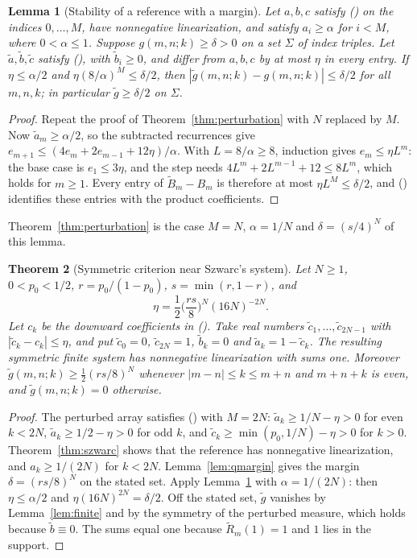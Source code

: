 \documentclass[twoside,10pt]{article}
\numberwithin{equation}{section}
\theoremstyle{slbody}
\newtheorem{theorem}{Theorem}[section]
\newtheorem{lemma}[theorem]{Lemma}
\theoremstyle{definition}
\theoremstyle{remark}
\renewcommand{\eqref}[1]{\textup{{\normalfont(\oldstylenums{\ref{#1}}}\normalfont)}}
\begin{document}
\begin{lemma}[Stability of a reference with a margin]\label{lem:stability}
Let $a,b,c$ satisfy \eqref{eq:basic} on the indices $0,\ldots,M$, have nonnegative linearization, and satisfy $a_i\geq\alpha$ for $i<M$, where $0<\alpha\leq1$. Suppose $g(m,n;k)\geq\delta>0$ on a set $\Sigma$ of index triples. Let $\widetilde a,\widetilde b,\widetilde c$ satisfy \eqref{eq:basic}, with $\widetilde b_i\geq0$, and differ from $a,b,c$ by at most $\eta$ in every entry. If $\eta\leq\alpha/2$ and $\eta(8/\alpha)^M\leq\delta/2$, then $|\widetilde g(m,n;k)-g(m,n;k)|\leq\delta/2$ for all $m,n,k$; in particular $\widetilde g\geq\delta/2$ on $\Sigma$.
\end{lemma}
\begin{proof}
Repeat the proof of Theorem~\ref{thm:perturbation} with $N$ replaced by $M$. Now $\widetilde a_m\geq\alpha/2$, so the subtracted recurrences give $e_{m+1}\leq(4e_m+2e_{m-1}+12\eta)/\alpha$. With $L=8/\alpha\geq8$, induction gives $e_m\leq\eta L^m$: the base case is $e_1\leq3\eta$, and the step needs $4L^m+2L^{m-1}+12\leq8L^m$, which holds for $m\geq1$. Every entry of $\widetilde B_m-B_m$ is therefore at most $\eta L^M\leq\delta/2$, and \eqref{eq:matrix-product} identifies these entries with the product coefficients.
\end{proof}

Theorem~\ref{thm:perturbation} is the case $M=N$, $\alpha=1/N$ and $\delta=(s/4)^N$ of this lemma.

\begin{theorem}[Symmetric criterion near Szwarc's system]\label{thm:symmetric}
Let $N\geq1$, $0<p_0<1/2$, $r=p_0/(1-p_0)$, $s=\min(r,1-r)$, and
\[
\eta=\frac12\Big(\frac{rs}8\Big)^N(16N)^{-2N}.
\]
Let $c_k$ be the downward coefficients in \eqref{eq:qarray}. Take real numbers $\widetilde c_1,\ldots,\widetilde c_{2N-1}$ with $|\widetilde c_k-c_k|\leq\eta$, and put $\widetilde c_0=0$, $\widetilde c_{2N}=1$, $\widetilde b_k=0$ and $\widetilde a_k=1-\widetilde c_k$. The resulting symmetric finite system has nonnegative linearization with sums one. Moreover $\widetilde g(m,n;k)\geq\frac12(rs/8)^N$ whenever $|m-n|\leq k\leq m+n$ and $m+n+k$ is even, and $\widetilde g(m,n;k)=0$ otherwise.
\end{theorem}
\begin{proof}
The perturbed array satisfies \eqref{eq:basic} with $M=2N$: $\widetilde a_k\geq1/N-\eta>0$ for even $k<2N$, $\widetilde a_k\geq1/2-\eta>0$ for odd $k$, and $\widetilde c_k\geq\min(p_0,1/N)-\eta>0$ for $k>0$. Theorem~\ref{thm:szwarc} shows that the reference has nonnegative linearization, and $a_k\geq1/(2N)$ for $k<2N$. Lemma~\ref{lem:qmargin} gives the margin $\delta=(rs/8)^N$ on the stated set. Apply Lemma~\ref{lem:stability} with $\alpha=1/(2N)$: then $\eta\leq\alpha/2$ and $\eta(16N)^{2N}=\delta/2$. Off the stated set, $\widetilde g$ vanishes by Lemma~\ref{lem:finite} and by the symmetry of the perturbed measure, which holds because $\widetilde b\equiv0$. The sums equal one because $\widetilde R_m(1)=1$ and $1$ lies in the support.
\end{proof}
\end{document}
